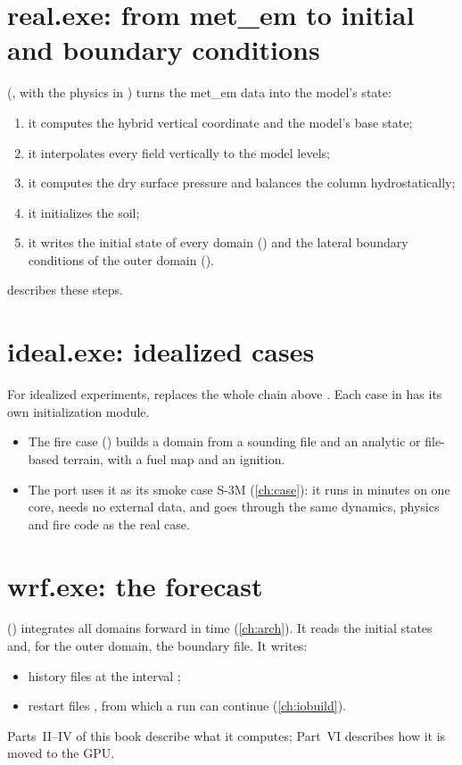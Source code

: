 \section{real.exe: from met\_em to initial and boundary conditions}

 (, with the physics in )
turns the met\_em data into the model's state:
\begin{enumerate}
  \item it computes the hybrid vertical coordinate and the model's base state;
  \item it interpolates every field vertically to the model levels;
  \item it computes the dry surface pressure and balances the column hydrostatically;
  \item it initializes the soil;
  \item it writes the initial state of every domain () and the lateral boundary conditions of the
    outer domain ().
\end{enumerate}
 describes these steps.

\section{ideal.exe: idealized cases}

For idealized experiments,  replaces the whole chain above . Each case in
 has its own initialization module.
\begin{itemize}
  \item The fire case  () builds a domain from a
    sounding file and an analytic or file-based terrain, with a fuel map and an ignition.
  \item The port uses it as its smoke case S-3M (\cref{ch:case}): it runs in minutes on one core, needs no external
    data, and goes through the same dynamics, physics and fire code as the real case.
\end{itemize}

\section{wrf.exe: the forecast}

 () integrates all domains forward in time (\cref{ch:arch}). It reads the initial
states and, for the outer domain, the boundary file. It writes:
\begin{itemize}
  \item history files  at the interval ;
  \item restart files , from which a run can continue (\cref{ch:iobuild}).
\end{itemize}
Parts~II--IV of this book describe what it computes; Part~VI describes how it is moved to the GPU.

